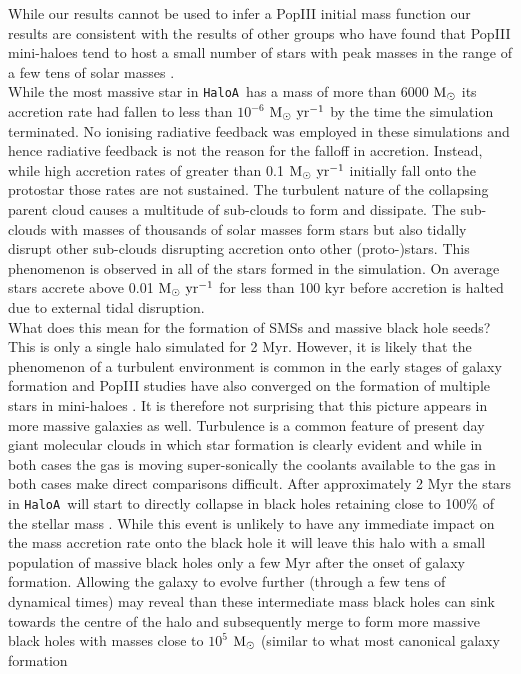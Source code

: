 \documentclass[graphics, twocolumn, usenatbib]{mn2e}
\newcommand{\msolar} {$\rm{M_{\odot}}~$}
\newcommand{\msolaryr} {$\rm{M_{\odot}~yr^{-1}}~$}
\newcommand{\ha} {\texttt{HaloA~}}
\begin{document}
While our results cannot be used to infer a PopIII initial mass function our results
are consistent with the results of other groups who have found that PopIII mini-haloes
tend to host a small number of stars with peak masses in the range of a few tens of
solar masses \citep{Hirano_2014, Susa_2014, Stacy_2016, Skinner_2020}.\\
\indent While the most massive star in \ha has a mass of more than 6000 \msolar its accretion rate had fallen
to less than $10^{-6}$ \msolaryr by the time the simulation terminated. No ionising radiative
feedback was employed in these simulations and hence radiative feedback is not the reason for
the falloff in accretion. Instead, while high accretion rates of greater than 0.1 \msolaryr initially
fall onto the protostar those rates are not sustained. The turbulent nature of the collapsing parent
cloud causes a multitude of sub-clouds to form and dissipate. The sub-clouds with masses of
thousands of solar masses form stars but also tidally disrupt other sub-clouds disrupting
accretion onto other (proto-)stars. This phenomenon is observed in all of the stars formed in the simulation.
On average stars accrete above 0.01 \msolaryr for less than 100 kyr before accretion is halted
due to external tidal disruption. \\
\indent What does this mean for the formation of SMSs and massive black hole seeds? This is only a
single halo simulated for 2 Myr. However, it is likely that the phenomenon of a
turbulent environment is common in the early stages of galaxy formation and
PopIII studies have also converged on the formation of multiple stars in mini-haloes
\citep[e.g.][]{Turk_2012}. It is therefore not surprising that this picture appears in
more massive galaxies as well. Turbulence is a common feature of present day giant molecular clouds in
which star formation is clearly evident \citep[e.g.][]{Girichidis_2020, Lee_2020, Krause_2020}
and while in both cases the gas is moving super-sonically the coolants available to the gas in both
cases make direct comparisons difficult. 
After approximately 2 Myr the stars in \ha will start to directly
collapse in black holes retaining close to 100\% of the stellar mass \citep{Heger_2003}. While this
event is unlikely to have any immediate impact on the mass accretion rate onto the black hole it will
leave this halo with a small population of massive black holes only a few Myr after the onset of galaxy formation. Allowing the galaxy to evolve further  (through a few tens of dynamical times) may
reveal than these intermediate mass black holes can sink towards the centre of the halo and subsequently merge to form more massive black holes with masses close to $10^5$ \msolar (similar to what most canonical galaxy formation
\end{document}
